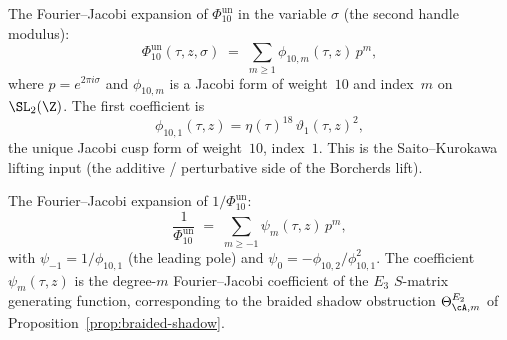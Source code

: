 \begin{remark}
\label{rem:fourier-jacobi-genus2}
The Fourier--Jacobi expansion of $\Phi_{10}^{\mathrm{un}}$ in the variable
$\sigma$ (the second handle modulus):
\[
 \Phi_{10}^{\mathrm{un}}(\tau, z, \sigma)
 \;=\;
 \sum_{m \geq 1} \phi_{10,m}(\tau, z)\, p^m,
\]
where $p = e^{2\pi i\sigma}$ and $\phi_{10,m}$ is a Jacobi form of
weight~$10$ and index~$m$ on $\SL_2(\Z)$. The first coefficient is
\[
 \phi_{10,1}(\tau, z) = \eta(\tau)^{18}\, \vartheta_1(\tau, z)^2,
\]
the unique Jacobi cusp form of weight~$10$, index~$1$. This is
the Saito--Kurokawa lifting input (the additive / perturbative side
of the Borcherds lift).

The Fourier--Jacobi expansion of $1/\Phi_{10}^{\mathrm{un}}$:
\[
 \frac{1}{\Phi_{10}^{\mathrm{un}}}
 \;=\;
 \sum_{m \geq -1} \psi_m(\tau, z)\, p^m,
\]
with $\psi_{-1} = 1/\phi_{10,1}$ (the leading pole) and
$\psi_0 = -\phi_{10,2}/\phi_{10,1}^2$. The coefficient
$\psi_m(\tau, z)$ is the degree-$m$ Fourier--Jacobi coefficient of
the $E_3$ $S$-matrix generating function, corresponding to the
braided shadow obstruction $\Theta^{E_2}_{\cA, m}$ of
Proposition~\ref{prop:braided-shadow}.
\end{remark}

